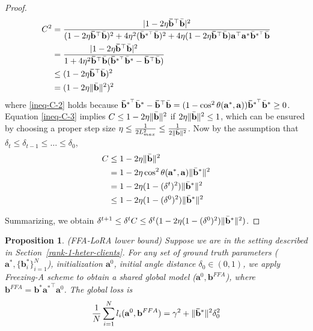 \documentclass{article}
\theoremstyle{plain}
\newtheorem{proposition}[theorem]{Proposition}
\theoremstyle{definition}
\theoremstyle{remark}
\begin{document}
\begin{proof}
  \begin{align}
      C^2 &= \frac{|1- 2\eta \mathbf{\Bar{b}}^{\top}\Bar{\mathbf{b}}|^2}{(1- 2\eta \mathbf{\Bar{b}}^{\top}\Bar{\mathbf{b}})^2  + 4\eta^2 (\Bar{\mathbf{b}}^{*^\top}\Bar{\mathbf{b}})^2  + 4\eta (1- 2\eta \mathbf{\Bar{b}}^{\top}\Bar{\mathbf{b}})\mathbf{a}^\top \mathbf{a}^* \Bar{\mathbf{b}}^{*^\top}\Bar{\mathbf{b}} }  \\
      & = \frac{|1- 2\eta \mathbf{\Bar{b}}^{\top}\Bar{\mathbf{b}}|^2}{1  +  4 \eta^2 \mathbf{\Bar{b}}^{\top}\Bar{\mathbf{b}} (\mathbf{\Bar{b}}^{*^\top}\Bar{\mathbf{b}}^*  - \mathbf{\Bar{b}}^{\top}\Bar{\mathbf{b}})} \\
      & \leq (1-2\eta \mathbf{\Bar{b}}^{\top}\Bar{\mathbf{b}})^2 \label{ineq-C-2}\\
      &= (1-2\eta \|\Bar{\mathbf{b}}\|^2)^2 \label{ineq-C-3}
  \end{align}
  where \eqref{ineq-C-2} holds because $
\mathbf{\Bar{b}}^{*^\top}\Bar{\mathbf{b}}^*  - \mathbf{\Bar{b}}^{\top}\Bar{\mathbf{b}} =(1-\cos^2 \theta (\mathbf{a}^*, \mathbf{a}))\mathbf{\Bar{b}}^{*^\top}\Bar{\mathbf{b}}^*  \geq 0$. Equation \eqref{ineq-C-3} implies $C\le 1-2\eta \|\Bar{\mathbf{b}}\|^2$  if $2\eta \|\Bar{\mathbf{b}}\|^2\le 1$, which can be ensured by choosing a proper step size $\eta \leq \frac{1}{2L_{max}^2} \leq \frac{1}{2\|\Bar{\mathbf{b}}\|^2}$. Now by the assumption that $\delta_t \leq \delta_{t-1} \leq \dots \leq \delta_0$,
\begin{align}
    C&\le 1-2\eta \|\Bar{\mathbf{b}}\|^2 \\
    &= 1-2\eta \cos^2 \theta (\mathbf{a}^*, \mathbf{a}) \|\Bar{\mathbf{b}}^*\|^2 \\
    &= 1-2\eta (1-(\delta^t)^2) \|\Bar{\mathbf{b}}^*\|^2 \\
    &\le 1-2\eta (1-(\delta^0)^2) \|\Bar{\mathbf{b}}^*\|^2 
\end{align}

Summarizing, we obtain $\delta^{t+1}\leq \delta^{t} C \le\delta^{t}  (1 - 2 \eta (1-(\delta^0)^2)\|\Bar{\mathbf{b}}^*\|^2)$.
\end{proof}
\begin{proposition} \label{fa-saturate}(FFA-LoRA lower bound)
Suppose we are in the setting described in Section~\ref{rank-1-heter-clients}. For any set of ground truth parameters ($\mathbf{a}^*,\{\mathbf{b}_i^*\}_{i=1}^N$), initialization $\mathbf{a}^0$, initial angle distance $\delta_0\in (0,1)$, we apply Freezing-A scheme to obtain a shared global model ($\mathbf{a}^0,\mathbf{b}^{FFA}$), where ${\mathbf{b}}^{FFA} = {\mathbf{b}}^*{\mathbf{a}^*}^\top \mathbf{a}^0$. The global loss is 
\begin{equation}
    \frac{1}{N}\sum_{i=1}^N l_i(\mathbf{a}^0,{\mathbf{b}}^{FFA}) = \gamma^2 + \| \mathbf{\Bar{b}}^*\|^2\delta_0^2 \label{fa-lower-bound}
\end{equation}
\end{proposition}
\end{document}
